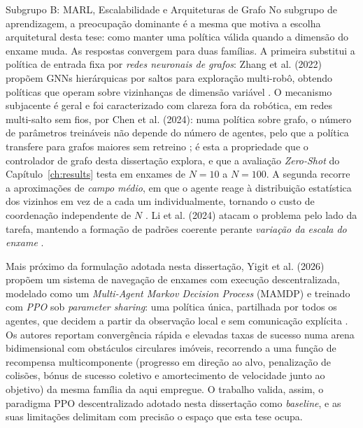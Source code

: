 \documentclass[12pt,reqno, twoside]{amsbook}
\makeatletter
\def\subsection{\@startsection{subsection}{2}%
      \z@{.5\linespacing\@plus.7\linespacing}{.25\linespacing}%
      {\normalfont\bfseries\flushleft}}
\theoremstyle{plain}
\numberwithin{equation}{chapter}
\numberwithin{section}{chapter}
\numberwithin{table}{chapter}
\numberwithin{figure}{chapter}
\makeatother
\begin{document}
\subsection{Subgrupo B: MARL, Escalabilidade e Arquiteturas de Grafo}
No subgrupo de aprendizagem, a preocupação dominante é a mesma que motiva a escolha arquitetural desta tese: como manter uma política válida quando a dimensão do enxame muda. As respostas convergem para duas famílias. A primeira substitui a política de entrada fixa por \emph{redes neuronais de grafos}: Zhang et al. (2022) propõem GNNs hierárquicas por saltos para exploração multi-robô, obtendo políticas que operam sobre vizinhanças de dimensão variável \cite{zhang2022h2gnn}. O mecanismo subjacente é geral e foi caracterizado com clareza fora da robótica, em redes multi-salto sem fios, por Chen et al. (2024): numa política sobre grafo, o número de parâmetros treináveis não depende do número de agentes, pelo que a política transfere para grafos maiores sem retreino \cite{chen2024graph}; é esta a propriedade que o controlador de grafo desta dissertação explora, e que a avaliação \textit{Zero-Shot} do Capítulo~\ref{ch:results} testa em enxames de $N=10$ a $N=100$. A segunda recorre a aproximações de \emph{campo médio}, em que o agente reage à distribuição estatística dos vizinhos em vez de a cada um individualmente, tornando o custo de coordenação independente de $N$ \cite{tang2023meanfield}. Li et al. (2024) atacam o problema pelo lado da tarefa, mantendo a formação de padrões coerente perante \emph{variação da escala do enxame} \cite{li2024shape}.

Mais próximo da formulação adotada nesta dissertação, Yigit et al. (2026) propõem um sistema de navegação de enxames com execução descentralizada, modelado como um \textit{Multi-Agent Markov Decision Process} (MAMDP) e treinado com \emph{PPO} sob \textit{parameter sharing}: uma política única, partilhada por todos os agentes, que decidem a partir da observação local e sem comunicação explícita \cite{yigit2026marl}. Os autores reportam convergência rápida e elevadas taxas de sucesso numa arena bidimensional com obstáculos circulares imóveis, recorrendo a uma função de recompensa multicomponente (progresso em direção ao alvo, penalização de colisões, bónus de sucesso coletivo e amortecimento de velocidade junto ao objetivo) da mesma família da aqui empregue. O trabalho valida, assim, o paradigma PPO descentralizado adotado nesta dissertação como \textit{baseline}, e as suas limitações delimitam com precisão o espaço que esta tese ocupa.
\end{document}
